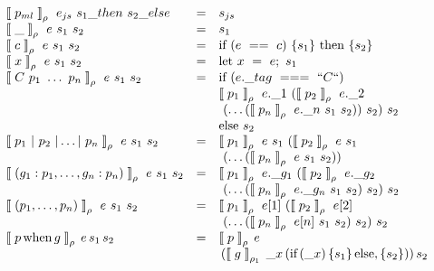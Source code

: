 \begin{center}
\small
$
\begin{array}{lll}
\llpar p_{ml} \rrpar _{\rho} ~ e_{js} ~ s_1\_then ~ s_2\_else &=& s_{js} \\
\llpar \_ \rrpar _{\rho} ~ e ~ s_1 ~ s_2 &=& s_1 \\
\llpar c \rrpar _{\rho} ~ e ~ s_1 ~ s_2 &=& \mbox{if} ~(e ~==~ c)~ \{ s_1 \} ~ \mbox{then} ~ \{ s_2 \} \\
\llpar x \rrpar _{\rho} ~ e ~ s_1 ~ s_2 &=& \mbox{let} ~ x ~=~ e; ~ s_1 \\

\llpar C~p_1 ~\ldots~ p_n \rrpar _{\rho} ~ e ~ s_1 ~ s_2 &=& \mbox{if} ~(e.\_tag ~===~ ``C``)\\ 
& & \llpar p_1 \rrpar _{\rho} ~ e.\_1 ~ (\llpar p_2 \rrpar _{\rho} ~ e.\_2 ~ \\ & & ~(\ldots (\llpar p_n \rrpar _{\rho} ~e.\_n ~ s_1 ~ s_2)) ~s_2)~s_2 \\
& & \mbox{else} ~ s_2 \\

\llpar p_1~|~p_2~|\ldots|~p_n \rrpar _{\rho} ~ e ~ s_1 ~ s_2 &=& \llpar p_1 \rrpar _{\rho} ~ e ~ s_1 ~ (\llpar p_2 \rrpar _{\rho} ~ e ~ s_1 ~\\ & & ~(\ldots (\llpar p_n \rrpar _{\rho} ~ e ~ s_1 ~ s_2)) \\

\llpar (g_1:p_1, \ldots, g_n:p_n) \rrpar _{\rho} ~ e ~ s_1 ~ s_2 &=& \llpar p_1 \rrpar _{\rho} ~ e.\_g_1 ~ (\llpar p_2 \rrpar _{\rho} ~ e.\_g_2 ~\\ & & ~(\ldots (\llpar p_n \rrpar _{\rho} ~ e.\_g_n ~ s_1 ~ s_2) ~ s_2)~ s_2 \\

\llpar (p_1, \ldots, p_n)  \rrpar _{\rho} ~ e ~ s_1 ~ s_2 &=& \llpar p_1 \rrpar _{\rho} ~ e[1] ~ (\llpar p_2 \rrpar _{\rho} ~ e[2] ~\\ & & ~(\ldots (\llpar p_n \rrpar _{\rho} ~ e[n] ~ s_1 ~ s_2) ~ s_2)~ s_2 \\

\llpar p\, \mbox{when}\, g \rrpar _{\rho} \, e \, s_1 \, s_2 &=& \llpar p \rrpar _{\rho} \, e\,\\ & & \, (\llpar g \rrpar _{\rho_1} \, \_x \, (\mbox{if} \, (\_x) \, \{ s_1 \} \, \mbox{else} , \{ s_2 \})) \,s_2
\end{array}
$\normalsize
\captionsetup{type=lstlisting}
\label{tbl:tr_pm}
\end{center}
 
